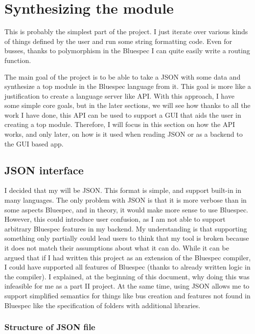 \documentclass[12pt]{report}
\begin{document}
\newpage

\section{Synthesizing the module}
This is probably the simplest part of the project. I just iterate over various kinds of things defined by the user and run some string formatting code. Even for busses, thanks to polymorphism in the Bluespec I can quite easily write a routing function. 
  
  
The main goal of the project is to be able to take a JSON with some data and synthesize a top module in the Bluespec language from it. This goal is more like a justification to create a language server like API. With this approach, I have some simple core goals, but in the later sections, we will see how thanks to all the work I have done, this API can be used to support a GUI that aids the user in creating a top module. Therefore, I will focus in this section on how the API works, and only later, on how is it used when reading JSON or as a backend to the GUI based app. 
  
  
\subsection{JSON interface}
I decided that my  will be JSON. This format is simple, and support built-in in many languages.
The only problem with JSON is that it is more verbose than in some aspects Bluespec, and in theory, it would make more sense to use Bluespec.
However, this could introduce user confusion, as I am not able to support arbitrary Bluespec features in my backend.
My understanding is that supporting something only partially could lead users to think that my tool is broken because it does not match their assumptions about what it can do.
While it can be argued that if I had written this project as an extension of the Bluespec compiler, I could have supported all features of Bluespec (thanks to already written logic in the compiler).
I explained, at the beginning of this document, why doing this was infeasible for me as a part II project.
At the same time, using JSON allows me to support simplified semantics for things like bus creation and features not found in Bluespec like the specification of folders with additional libraries.

\newpage 

\subsubsection{Structure of JSON file}
\end{document}
